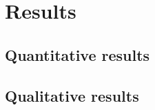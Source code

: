 \chapter{Results}
\label{ch:results}

\section{Quantitative results}
\label{sec:quantitative}

\section{Qualitative results}
\label{sec:qualitative}
